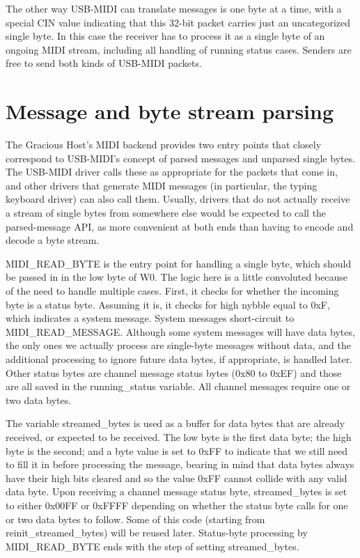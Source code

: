 The other way USB-MIDI can translate messages is one byte at a time, with a
special CIN value indicating that this 32-bit packet carries just an
uncategorized single byte.  In this case the receiver has to process it as
a single byte of an ongoing MIDI stream, including all handling of running
status cases.  Senders are free to send both kinds of USB-MIDI packets.

\section{Message and byte stream parsing}

The Gracious Host's MIDI backend provides two entry points that closely
correspond to USB-MIDI's concept of parsed messages and unparsed single
bytes.  The USB-MIDI driver calls these as appropriate for the packets that
come in, and other drivers that generate MIDI messages (in particular, the
typing keyboard driver) can also call them.  Usually, drivers that do not
actually receive a stream of single bytes from somewhere else would be
expected to call the parsed-message API, as more convenient at both ends than
having to encode and decode a byte stream.

MIDI\_READ\_BYTE is the entry point for handling a single byte, which should
be passed in in the low byte of W0.  The logic here is a little convoluted
because of the need to handle multiple cases.  First, it checks for whether
the incoming byte is a status byte.  Assuming it is, it checks for high
nybble equal to 0xF, which indicates a system message.  System messages
short-circuit to MIDI\_READ\_MESSAGE.  Although some system messages will
have data bytes, the only ones we actually process are single-byte messages
without data, and the additional processing to ignore future data bytes, if
appropriate, is handled later.  Other status bytes are channel message
status bytes (0x80 to 0xEF) and those are all saved in the running\_status
variable.  All channel messages require one or two data bytes.

The variable streamed\_bytes is used as a buffer for data bytes that are
already received, or expected to be received.  The low byte is the first
data byte; the high byte is the second; and a byte value is set to 0xFF to
indicate that we still need to fill it in before processing the message,
bearing in mind that data bytes always have their high bits cleared and so
the value 0xFF cannot collide with any valid data byte.  Upon receiving a
channel message status byte, streamed\_bytes is set to either 0x00FF or
0xFFFF depending on whether the status byte calls for one or two data bytes
to follow.  Some of this code (starting from reinit\_streamed\_bytes) will
be reused later.  Status-byte processing by MIDI\_READ\_BYTE ends with the
step of setting streamed\_bytes.

